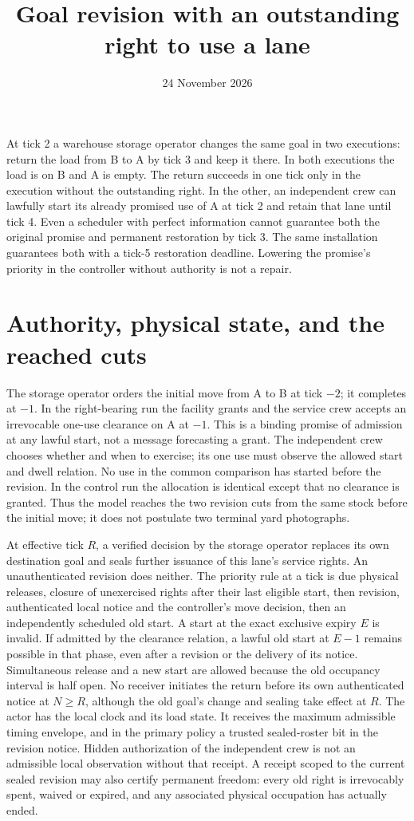 \documentclass[11pt]{article}
\title{Goal revision with an outstanding right to use a lane}
\date{24 November 2026}
\begin{document}
\maketitle

At tick 2 a warehouse storage operator changes the same goal in two executions: return the load from B to A by tick 3 and keep it there. In both executions the load is on B and A is empty. The return succeeds in one tick only in the execution without the outstanding right. In the other, an independent crew can lawfully start its already promised use of A at tick 2 and retain that lane until tick 4. Even a scheduler with perfect information cannot guarantee both the original promise and permanent restoration by tick 3. The same installation guarantees both with a tick-5 restoration deadline. Lowering the promise's priority in the controller without authority is not a repair.

\section{Authority, physical state, and the reached cuts}
The storage operator orders the initial move from A to B at tick $-2$; it completes at $-1$. In the right-bearing run the facility grants and the service crew accepts an irrevocable one-use clearance on A at $-1$. This is a binding promise of admission at any lawful start, not a message forecasting a grant. The independent crew chooses whether and when to exercise; its one use must observe the allowed start and dwell relation. No use in the common comparison has started before the revision. In the control run the allocation is identical except that no clearance is granted. Thus the model reaches the two revision cuts from the same stock before the initial move; it does not postulate two terminal yard photographs.

At effective tick $R$, a verified decision by the storage operator replaces its own destination goal and seals further issuance of this lane's service rights. An unauthenticated revision does neither. The priority rule at a tick is due physical releases, closure of unexercised rights after their last eligible start, then revision, authenticated local notice and the controller's move decision, then an independently scheduled old start. A start at the exact exclusive expiry $E$ is invalid. If admitted by the clearance relation, a lawful old start at $E-1$ remains possible in that phase, even after a revision or the delivery of its notice. Simultaneous release and a new start are allowed because the old occupancy interval is half open. No receiver initiates the return before its own authenticated notice at $N\ge R$, although the old goal's change and sealing take effect at $R$. The actor has the local clock and its load state. It receives the maximum admissible timing envelope, and in the primary policy a trusted sealed-roster bit in the revision notice. Hidden authorization of the independent crew is not an admissible local observation without that receipt. A receipt scoped to the current sealed revision may also certify permanent freedom: every old right is irrevocably spent, waived or expired, and any associated physical occupation has actually ended.
\end{document}
